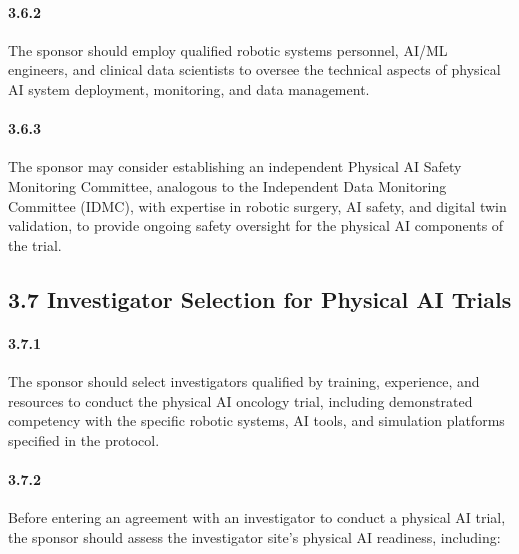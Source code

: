 \paragraph{3.6.2} The sponsor should employ qualified robotic systems personnel, AI/ML engineers, and clinical data scientists to oversee the technical aspects of physical AI system deployment, monitoring, and data management.

\paragraph{3.6.3} The sponsor may consider establishing an independent Physical AI Safety Monitoring Committee, analogous to the Independent Data Monitoring Committee (IDMC), with expertise in robotic surgery, AI safety, and digital twin validation, to provide ongoing safety oversight for the physical AI components of the trial.

\subsection{3.7 Investigator Selection for Physical AI Trials}

\paragraph{3.7.1} The sponsor should select investigators qualified by training, experience, and resources to conduct the physical AI oncology trial, including demonstrated competency with the specific robotic systems, AI tools, and simulation platforms specified in the protocol.

\paragraph{3.7.2} Before entering an agreement with an investigator to conduct a physical AI trial, the sponsor should assess the investigator site's physical AI readiness, including:

